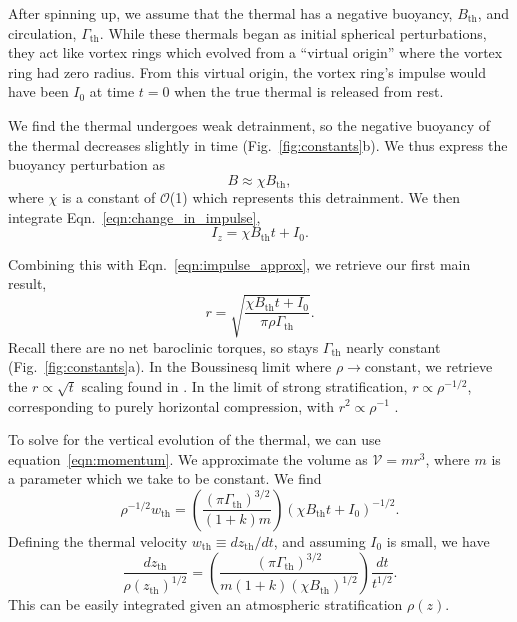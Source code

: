 \documentclass[twocolumn, amsmath, amsfonts, amssymb, trackchanges]{aastex62}
\newcommand{\LJ}{\citetalias{lecoanet&jeevanjee2018}}
\begin{document}
After spinning up, we assume that the thermal has a negative buoyancy, $B_{\text{th}}$, and circulation, $\Gamma_{\text{th}}$.
While these thermals began as initial spherical perturbations, they act like vortex rings which evolved from a ``virtual origin'' where the vortex ring had zero radius.
From this virtual origin, the vortex ring's impulse would have been $I_0$ at time $t = 0$ when the true thermal is released from rest.

We find the thermal undergoes weak detrainment, so the negative buoyancy of the thermal decreases slightly in time (Fig.~\ref{fig:constants}b).
We thus express the buoyancy perturbation as 
\begin{equation}
B \approx \chi B_{\text{th}},
\end{equation}
where $\chi$ is a constant of $\mathcal{O}$(1) which represents this detrainment. 
We then integrate Eqn.~\ref{eqn:change_in_impulse},
\begin{equation*}
I_z = \chi B_{\text{th}} t + I_0.
\end{equation*}

Combining this with Eqn.~\ref{eqn:impulse_approx}, we retrieve our first main result,
\begin{equation}
r = \sqrt{\frac{\chi B_{\text{th}} t + I_0}{\pi\rho\Gamma_{\text{th}}}}.
\label{eqn:r_theory}
\end{equation}
Recall there are no net baroclinic torques, so stays $\Gamma_{\text{th}}$ nearly constant (Fig.~\ref{fig:constants}a).
In the Boussinesq limit where $\rho \rightarrow \text{constant}$, we retrieve the $r \propto \sqrt{t}$ scaling found in \LJ.
In the limit of strong stratification, $r \propto \rho^{-1/2}$, corresponding to purely horizontal compression, with $r^2 \propto \rho^{-1}$ \citep{brandenburg2016}.

To solve for the vertical evolution of the thermal, we can use equation~\ref{eqn:momentum}.
We approximate the volume as $\mathcal{V} = m r^3$, where $m$ is a parameter which we take to be constant.
We find
\begin{equation}
\rho^{-1/2} w_{\text{th}} = \left(\frac{(\pi \Gamma_{\text{th}})^{3/2}}{(1 + k) m}\right)(\chi B_{\text{th}} t + I_0)^{-1/2}.
\end{equation}
Defining the thermal velocity $w_{\text{th}} \equiv dz_{\text{th}}/dt$, and assuming $I_0$ is small, we have
\begin{equation}
\frac{dz_{\text{th}}}{\rho(z_{\text{th}})^{1/2}} =
\left(\frac{(\pi\Gamma_{\text{th}})^{3/2}}{m(1 + k)(\chi B_{\text{th}})^{1/2}}\right)\frac{dt}{t^{1/2}}.
\label{eqn:dz_theory}
\end{equation}
This can be easily integrated given an atmospheric stratification $\rho(z)$.
\end{document}

